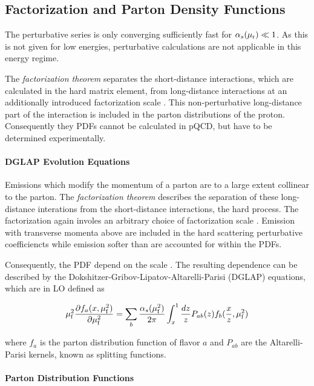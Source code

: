 \subsection{Factorization and Parton Density Functions}
\label{sec:factorization}

The perturbative series is only converging sufficiently fast for $\alpha_{s}(\mu_{\mathrm{r}}) \ll
1$. As this is not given for low energies, perturbative calculations are not
applicable in this energy regime. 


The \emph{factorization theorem} separates the short-distance interactions,
which are calculated in the hard matrix element, from long-distance interactions
at an additionally introduced factorization scale \muf. This non-perturbative
long-distance part of the interaction is included in the parton distributions of
the proton. Consequently they PDFs cannot be calculated in pQCD, but have to be
determined experimentally.

\paragraph{DGLAP Evolution Equations}

Emissions which modify the momentum of a parton are to a large extent collinear
to the parton. The \emph{factorization theorem} describes the separation of
these long-distance interations from the short-distance interactions, the hard
process. The factorization again involes an arbitrary choice of factorization
scale \muf. Emission with transverse momenta above \muf are included in the hard
scattering perturbative coefficiencts while emission softer than \muf are
accounted for within the PDFs.

Consequently, the PDF depend on the scale \muf. The resulting dependence can be
described by the Dokshitzer-Gribov-Lipatov-Altarelli-Parisi (DGLAP) equations,
which are in LO defined as

\begin{equation*}
    \mu_{\mathrm{f}}^2 \frac{\partial f_a (x, \mu_{\mathrm{f}}^2)}{\partial \mu_{\mathrm{f}}^2} = \sum_b \frac{\alpha_{s}(\mu_{\mathrm{f}}^2)}{2 \pi} \int_x^1
    \frac{d z}{z} P_{ab}(z) f_b(\frac{x}{z}, \mu_{\mathrm{f}}^2)
\end{equation*}

where $f_a$ is the parton distribution function of flavor $a$ and $P_{ab}$ are
the Altarelli-Parisi kernels, known as splitting functions. 

\paragraph{Parton Distribution Functions}

